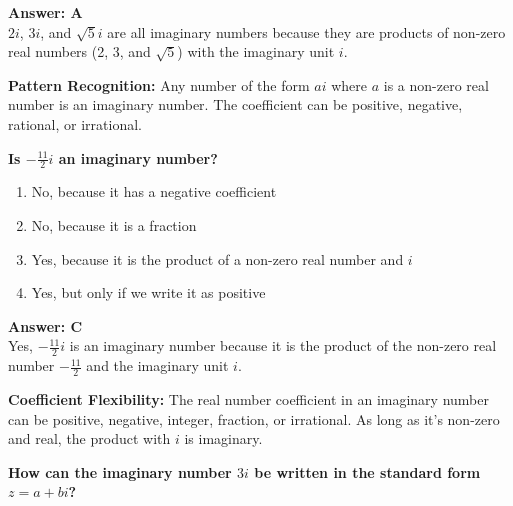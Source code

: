 \documentclass[12pt,a4paper]{article}
\begin{document}
\begin{answerstyle}
\textbf{Answer: A} \\
\( 2i \), \( 3i \), and \( \sqrt{5}i \) are all imaginary numbers because they are products of non-zero real numbers (2, 3, and \( \sqrt{5} \)) with the imaginary unit \( i \).
\end{answerstyle}

\begin{conceptbox}
\textbf{Pattern Recognition:} Any number of the form \( ai \) where \( a \) is a non-zero real number is an imaginary number. The coefficient can be positive, negative, rational, or irrational.
\end{conceptbox}

\newpage
\begin{questiontitle}[MCQ 27]
\textbf{Is \( -\frac{11}{2}i \) an imaginary number?}
\end{questiontitle}

\begin{partbox}[Options]
\begin{enumerate}[label=\Alph*.]
    \item No, because it has a negative coefficient
    \item No, because it is a fraction
    \item Yes, because it is the product of a non-zero real number and \( i \)
    \item Yes, but only if we write it as positive
\end{enumerate}
\end{partbox}

\begin{answerstyle}
\textbf{Answer: C} \\
Yes, \( -\frac{11}{2}i \) is an imaginary number because it is the product of the non-zero real number \( -\frac{11}{2} \) and the imaginary unit \( i \).
\end{answerstyle}

\begin{conceptbox}
\textbf{Coefficient Flexibility:} The real number coefficient in an imaginary number can be positive, negative, integer, fraction, or irrational. As long as it's non-zero and real, the product with \( i \) is imaginary.
\end{conceptbox}

\newpage
\begin{questiontitle}[MCQ 28]
\textbf{How can the imaginary number \( 3i \) be written in the standard form \( z = a + bi \)?}
\end{questiontitle}
\end{document}
